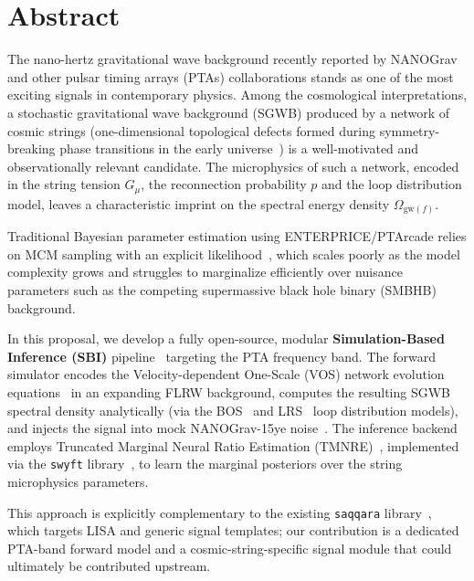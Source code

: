 \section{Abstract}\label{sec:1-abstract}
The nano-hertz gravitational wave background recently reported by NANOGrav~\cite{afzal_nanograv_2023} and other pulsar timing arrays (PTAs) collaborations stands as one of the most exciting signals in contemporary physics.
Among the cosmological interpretations, a stochastic gravitational wave background (SGWB) produced by a network of cosmic strings (one-dimensional topological defects formed during symmetry-breaking phase transitions in the early universe~\cite{kibble_topology_1976}) is a well-motivated and observationally relevant candidate.
The microphysics of such a network, encoded in the string tension $G_{\mu}$, the reconnection probability $p$ and the loop distribution model, leaves a characteristic imprint on the spectral energy density $\Omega_{\text{gw}(f)}$.

Traditional Bayesian parameter estimation using ENTERPRICE/PTArcade relies on MCM sampling with an explicit likelihood~\cite{ellis_enterprise_2020,mitridate_ptarcade_2023}, which scales poorly as the model complexity grows and struggles to marginalize efficiently over nuisance parameters such as the competing supermassive black hole binary (SMBHB) background.

In this proposal, we develop a fully open-source, modular \textbf{Simulation-Based Inference (SBI)} pipeline~\cite{cranmer_frontier_2020} targeting the PTA frequency band.
The forward simulator encodes the Velocity-dependent One-Scale (VOS) network evolution equations~\cite{martins_extending_2002} in an expanding FLRW background, computes the resulting SGWB spectral density analytically (via the BOS~\cite{blanco-pillado_number_2014} and LRS~\cite{lorenz_cosmic_2010} loop distribution models), and injects the signal into mock NANOGrav-15ye noise~\cite{johnson_nanograv_2024}.
The inference backend employs Truncated Marginal Neural Ratio Estimation (TMNRE)~\cite{miller_truncated_2021}, implemented via the \texttt{swyft} library~\cite{miller_swyft_2022}, to learn the marginal posteriors over the string microphysics parameters.

This approach is explicitly complementary to the existing \texttt{saqqara} library~\cite{alvey_simulationbased_2024}, which targets LISA and generic signal templates; our contribution is a dedicated PTA-band forward model and a cosmic-string-specific signal module that could ultimately be contributed upstream.

